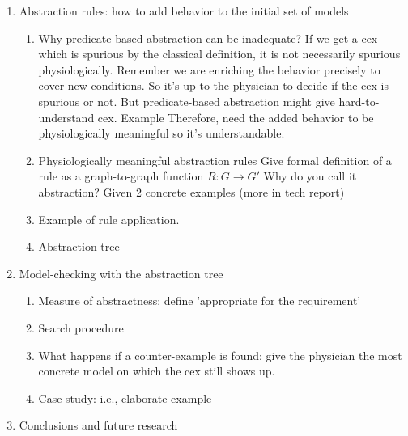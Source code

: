 \begin{enumerate}
	\item Abstraction rules: how to add behavior to the initial set of models
	\begin{enumerate}
		\item Why predicate-based abstraction can be inadequate?
		\label{ar:inadequate}
		\subitem If we get a cex which is spurious by the classical definition, it is not necessarily spurious physiologically. Remember we are enriching the behavior precisely to cover new conditions.
		\subitem So it's up to the physician to decide if the cex is spurious or not. But predicate-based abstraction might give hard-to-understand cex.
		\subitem Example
		\subitem Therefore, need the added behavior to be physiologically meaningful so it's understandable.
		\item Physiologically meaningful abstraction rules
		\subitem Give formal definition of a rule as a graph-to-graph function $R: G \rightarrow G'$ 
		\subitem Why do you call it abstraction? 
		\subitem Given 2 concrete examples (more in tech report)
		\item Example of rule application.
		\item Abstraction tree		
	\end{enumerate}
	
	\item Model-checking with the abstraction tree
	\begin{enumerate}
		\item Measure of abstractness; define 'appropriate for the requirement'
		\item Search procedure
		\item What happens if a counter-example is found: give the physician the most concrete model on which the cex still shows up.
		\item Case study: i.e., elaborate example
	\end{enumerate}
	
	\item Conclusions and future research
	
\end{enumerate}


